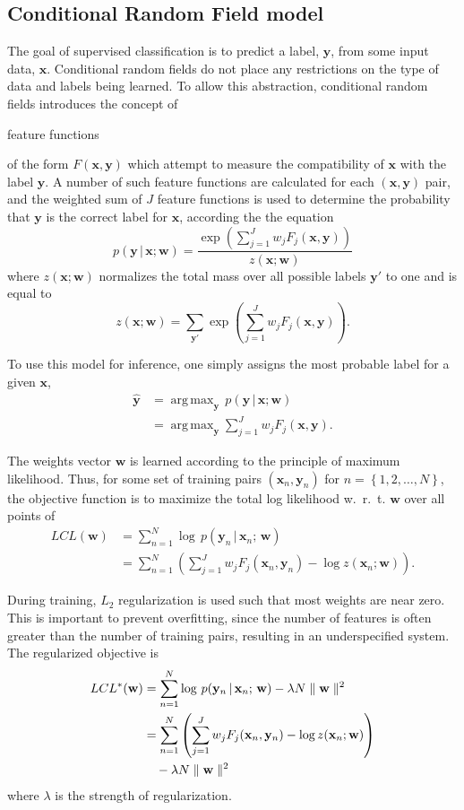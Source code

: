 \documentclass[10pt,twocolumn,letterpaper]{article}
\newcommand{\x}{\mathbf{x}}
\newcommand{\y}{\mathbf{y}}
\newcommand{\w}{\mathbf{w}}
\DeclareMathOperator*{\argmax}{arg\,max}
\begin{document}
\subsection{Conditional Random Field model}



The goal of supervised classification is to predict a label, $\y$, from some input data, $\x$. Conditional random fields do not place any restrictions on the type of data and labels being learned. To allow this abstraction, conditional random fields introduces the concept of \begin{em}feature functions\end{em} of the form $F(\x,\y)$ which attempt to measure the compatibility of $\x$ with the label $\y$. A number of such feature functions are calculated for each $(\x,\y)$ pair, and the weighted sum of $J$ feature functions is used to determine the probability that $\y$ is the correct label for $\x$, according the the equation
\begin{equation}
	p(\y\,|\,\x;\w) = \frac{\exp \left( \sum_{j=1}^J w_j F_j (\x,\y) \right)}{z(\x;\w)}
\end{equation}
where $z(\x;\w)$ normalizes the total mass over all possible labels $\y'$ to one and is equal to
\begin{equation}
	z(\x;\w) = \sum_{\y'} \exp \left( \sum_{j=1}^J w_j F_j (\x,\y) \right). \label{Eq:partition}
\end{equation}

To use this model for inference, one simply assigns the most probable label for a given $\x$,
\begin{align}
	\hat{\y} & =\argmax_{\y} \, p(\y\,|\,\x;\w) \\
		&= \argmax_{\y} \sum_{j=1}^J w_j F_j(\x,\y).
		\label{equation}
\end{align}


The weights vector $\w$ is learned according to the principle of maximum likelihood. Thus, for some set of training pairs $(\x_n,\y_n)$ for $n=\left\{1,2,\dots,N\right\}$, the objective function is to maximize the total log likelihood w.~r.~t. $\w$ over all points of
\begin{align}
	LCL(\w) &= \sum_{n=1}^N \log\,p(\y_n\,|\,\x_n ;\,\w) \\
		&= \sum_{n=1}^N \left( \sum_{j=1}^J w_j F_j (\x_n,\y_n) - \log z(\x_n;\w) \right).
\end{align}

During training, $L_2$ regularization is used such that most weights are near zero. This is important to prevent overfitting, since the number of features is often greater than the number of training pairs, resulting in an underspecified system. The regularized objective is
\begin{align}
	LCL^*(\w) &= \sum_{n=1}^N \log\,p(\y_n\,|\,\x_n ;\,\w) - \lambda N\parallel \w \parallel^2 \\
		&= \sum_{n=1}^N \left( \sum_{j=1}^J w_j F_j (\x_n,\y_n)  - \log z(\x_n;\w) \right) \notag \\
		&\hspace{1 em}  - \lambda N\parallel \w \parallel^2
		\label{Eq:rLCL}
\end{align}
where $\lambda$ is the strength of regularization.
\end{document}
